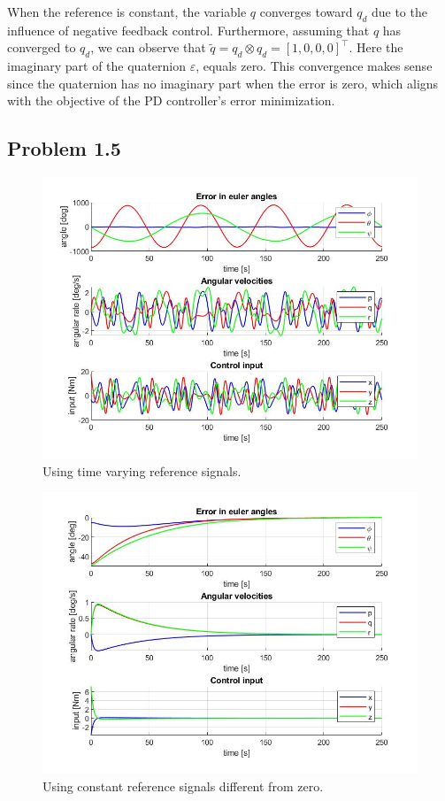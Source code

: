 When the reference is constant, the variable $q$ converges toward $q_d$ due to the influence of negative feedback control. Furthermore, assuming that $q$ has converged to $q_d$, we can observe that $\tilde q = q_d\otimes q_d = [1, 0, 0, 0]^\top$. Here the imaginary part of the quaternion $\varepsilon$, equals zero. This convergence makes sense since the quaternion has no imaginary part when the error is zero, which aligns with the objective of the PD controller's error minimization.

\subsection*{Problem 1.5}

\begin{figure}[ht]
	\centering
	\includegraphics[width=1\textwidth]{figures/task1_5.jpg} 
	\caption{Using time varying reference signals.}
	\label{fig:task15}
\end{figure}

\begin{figure}[ht]
	\centering
	\includegraphics[width=1\textwidth]{figures/task1_5const.jpg} 
	\caption{Using constant reference signals different from zero.}
	\label{fig:task15const}
\end{figure}

